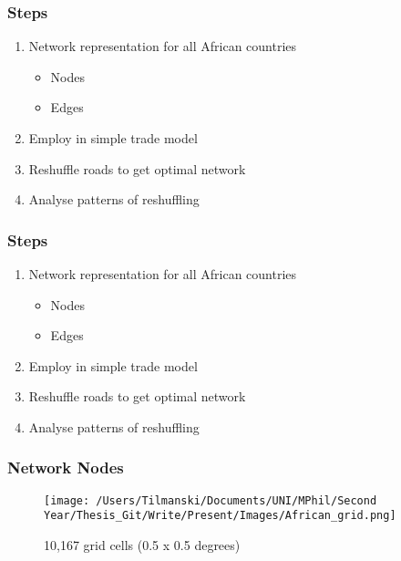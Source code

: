 \documentclass[]{beamer}   	%
\begin{document}
\begin{frame}
  \frametitle{Steps}
  \begin{enumerate}
    \item Network representation for all African countries
    \begin{itemize}
      \item Nodes
      \item Edges
    \end{itemize}
    \item Employ in simple trade model
    \item Reshuffle roads to get optimal network
    \item Analyse patterns of reshuffling
  \end{enumerate}
\end{frame}

\begin{frame}
  \frametitle{Steps}
  \begin{enumerate}
    \item \alert{Network representation for all African countries}
    \begin{itemize}
      \item \alert{Nodes}
      \item Edges
    \end{itemize}
    \item Employ in simple trade model
    \item Reshuffle roads to get optimal network
    \item Analyse patterns of reshuffling
  \end{enumerate}
\end{frame}

\begin{frame}
  \frametitle{Network Nodes}
  \begin{figure}
    \texttt{[image: /Users/Tilmanski/Documents/UNI/MPhil/Second Year/Thesis\_Git/Write/Present/Images/African\_grid.png]}
    \caption{10,167 grid cells (0.5 x 0.5 degrees)}
  \end{figure}
\end{frame}
\end{document}

